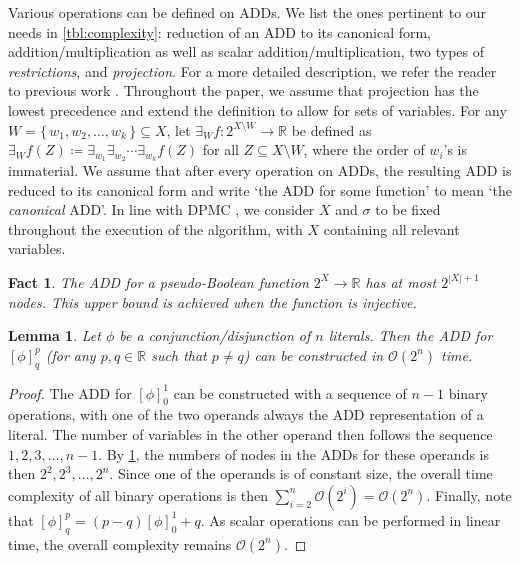 \documentclass{article}
\newtheorem{fact}{Fact}
\newtheorem{lemma}{Lemma}
\theoremstyle{definition}
\theoremstyle{remark}
\begin{document}
Various operations can be defined on ADDs. We list the ones pertinent to our
needs in \cref{tbl:complexity}: reduction of an ADD to its canonical form,
addition/multiplication as well as scalar addition/multiplication, two types of
\emph{restrictions}, and \emph{projection}. For a more detailed description, we
refer the reader to previous work
\cite{DBLP:journals/fmsd/BaharFGHMPS97,my_uai_paper,DBLP:conf/aaai/DudekPV20}.
Throughout the paper, we assume that projection has the lowest precedence and
extend the definition to allow for sets of variables. For any $W = \{\,w_1, w_2,
\dots, w_k\,\} \subseteq X$, let $\exists_W f\colon 2^{X \setminus W} \to
\mathbb{R}$ be defined as $\exists_Wf(Z) \coloneqq
\exists_{w_1}\exists_{w_2}\cdots\exists_{w_k}f(Z)$ for all $Z \subseteq X
\setminus W$, where the order of $w_i$'s is immaterial. We assume that after
every operation on ADDs, the resulting ADD is reduced to its canonical form and
write `the ADD for some function' to mean `the \emph{canonical} ADD'. In line
with \textsc{DPMC} \cite{DBLP:conf/cp/DudekPV20}, we consider $X$ and $\sigma$
to be fixed throughout the execution of the algorithm, with $X$ containing all
relevant variables.

\begin{fact} \label{lemma:add_size}
  The ADD for a pseudo-Boolean function $2^X \to \mathbb{R}$ has at most
  $2^{|X|+1}$ nodes. This upper bound is achieved when the function is
  injective.
\end{fact}

\begin{lemma} \label{lemma:clause_time}
  Let $\phi$ be a conjunction/disjunction of $n$ literals. Then the ADD for
  $[\phi]^p_q$ (for any $p, q \in \mathbb{R}$ such that $p \ne q$) can be
  constructed in $\mathcal{O}(2^n)$ time.
\end{lemma}
\begin{proof}
  The ADD for $[\phi]_0^1$ can be constructed with a sequence of $n-1$ binary
  operations, with one of the two operands always the ADD representation of a
  literal. The number of variables in the other operand then follows the
  sequence $1, 2, 3, \dots, n-1$. By \cref{lemma:add_size}, the numbers of nodes
  in the ADDs for these operands is then $2^2, 2^3,
  \dots, 2^n$. Since one of the operands is of constant size,
  the overall time complexity of all binary operations is then
  $\sum_{i=2}^n \mathcal{O}(2^i) = \mathcal{O}(2^n)$. Finally, note that
  $[\phi]_q^p = (p-q)[\phi]_0^1 + q$. As scalar operations can be performed in
  linear time, the overall complexity remains $\mathcal{O}(2^n)$.
\end{proof}
\end{document}
